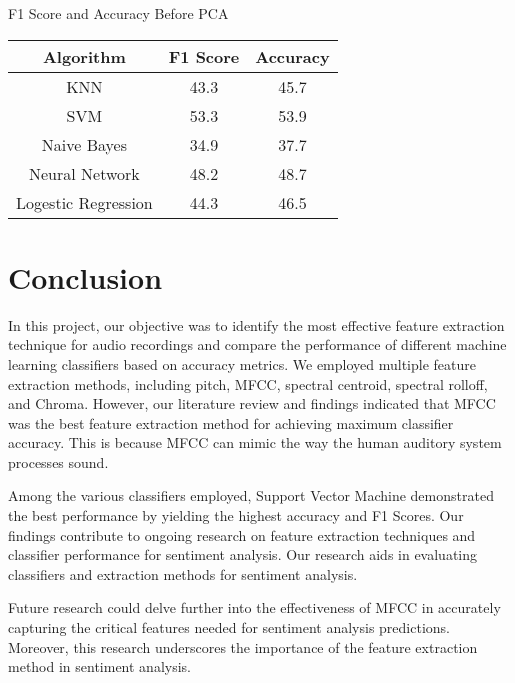 \documentclass[conference]{IEEEtran}
\begin{document}
\centering
\caption{F1 Score and Accuracy Before PCA}
\begin{tabular}{|c|c|c|}
    \hline
    Algorithm & F1 Score & Accuracy \\
    \hline
    KNN & 43.3 & 45.7 \\
    \hline
    SVM & 53.3 & 53.9 \\
    \hline
    Naive Bayes & 34.9 & 37.7 \\
    \hline
    Neural Network & 48.2 & 48.7 \\
    \hline
    Logestic Regression & 44.3 & 46.5 \\
    \hline 
   \end{tabular}



\section{Conclusion}
In this project, our objective was to identify the most effective feature extraction technique for audio recordings and compare the performance of different machine learning classifiers based on accuracy metrics. We employed multiple feature extraction methods, including pitch, MFCC, spectral centroid, spectral rolloff, and Chroma. However, our literature review and findings indicated that MFCC was the best feature extraction method for achieving maximum classifier accuracy. This is because MFCC can mimic the way the human auditory system processes sound.

Among the various classifiers employed, Support Vector Machine demonstrated the best performance by yielding the highest accuracy and F1 Scores. Our findings contribute to ongoing research on feature extraction techniques and classifier performance for sentiment analysis. Our research aids in evaluating classifiers and extraction methods for sentiment analysis.

Future research could delve further into the effectiveness of MFCC in accurately capturing the critical features needed for sentiment analysis predictions. Moreover, this research underscores the importance of the feature extraction method in sentiment analysis.  
\end{document}
